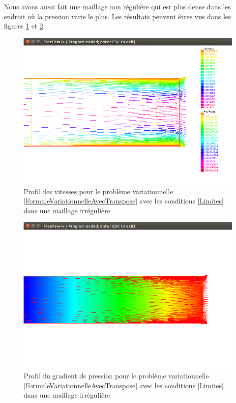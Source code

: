 \documentclass[11pt,a4paper]{article}
\numberwithin{equation}{subsection}
\numberwithin{figure}{subsection}
\begin{document}
Nous avons aussi fait une maillage non régulière qui est plus dense dans les endroit où la pression varie le plus. Les résultats peuvent êtres vus dans les figures \ref{StokesLimitesTransposeVitessesIrregulier} et \ref{StokesLimitesTransposePressionIrregulier}.

\begin{figure}[h]
\centering
\includegraphics[scale=0.4]{StokesLimitesTransposeVitessesIrregulier.png}
\caption{Profil des vitesses pour le problème variationnelle \ref{FormuleVariationnelleAvecTranspose} avec les conditions \ref{Limites} dans une maillage irrégulière}
\label{StokesLimitesTransposeVitessesIrregulier}
\end{figure}

\begin{figure}[h]
\centering
\includegraphics[scale=0.4]{StokesLimitesTransposePressionIrregulier.png}
\caption{Profil du gradient de pression pour le problème variationnelle \ref{FormuleVariationnelleAvecTranspose} avec les conditions \ref{Limites} dans une maillage irrégulière}
\label{StokesLimitesTransposePressionIrregulier}
\end{figure}
\end{document}
